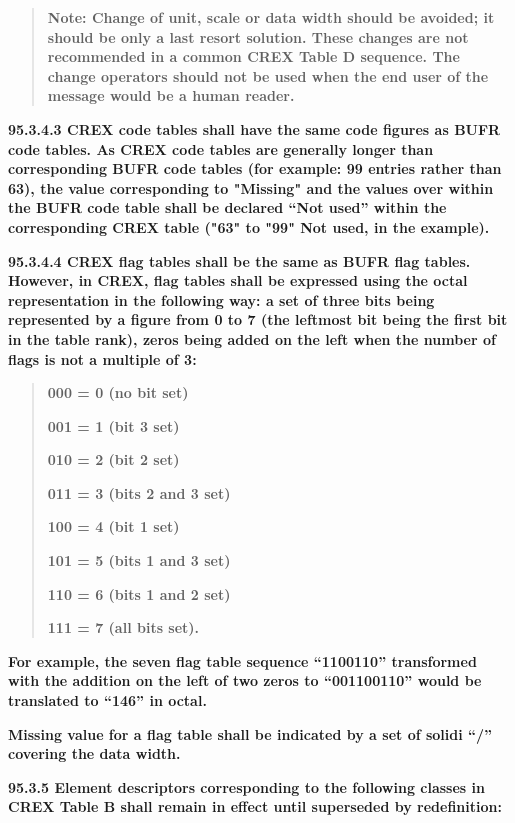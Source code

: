 \begin{quote}
\textbf{Note: Change of unit, scale or data width should be avoided; it should be only a last resort solution. These changes are not recommended in a common CREX Table D sequence. The change operators should not be used when the end user of the message would be a human reader.}
\end{quote}

\textbf{95.3.4.3 CREX code tables shall have the same code figures as BUFR code tables. As CREX code tables are generally longer than corresponding BUFR code tables (for example: 99 entries rather than 63), the value corresponding to "Missing" and the values over within the BUFR code table shall be declared ``Not used'' within the corresponding CREX table ("63" to "99" Not used, in the example).}

\textbf{95.3.4.4 CREX flag tables shall be the same as BUFR flag tables. However, in CREX, flag tables shall be expressed using the octal representation in the following way: a set of three bits being represented by a figure from 0 to 7 (the leftmost bit being the first bit in the table rank), zeros being added on the left when the number of flags is not a multiple of 3:}

\begin{quote}
\textbf{000 = 0 (no bit set)}

\textbf{001 = 1 (bit 3 set)}

\textbf{010 = 2 (bit 2 set)}

\textbf{011 = 3 (bits 2 and 3 set)}

\textbf{100 = 4 (bit 1 set)}

\textbf{101 = 5 (bits 1 and 3 set)}

\textbf{110 = 6 (bits 1 and 2 set)}

\textbf{111 = 7 (all bits set).}
\end{quote}

\textbf{For example, the seven flag table sequence ``1100110'' transformed with the addition on the left of two zeros to ``001100110'' would be translated to ``146'' in octal.}

\textbf{Missing value for a flag table shall be indicated by a set of solidi ``/'' covering the data width.}

\textbf{95.3.5 Element descriptors corresponding to the following classes in CREX Table B shall remain in effect until superseded by redefinition:}

